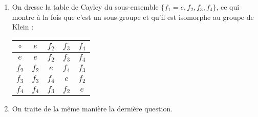 \begin{enumerate}
\item On dresse la table de Cayley du sous-ensemble $\{f_1=e, f_2,f_3, f_4\}$, ce qui montre à la fois que c'est un sous-groupe et qu'il est isomorphe au groupe de Klein :

\begin{center}
  \begin{tabular}{c|cccc}
    $\circ$    &      $e$ &      $f_2$  & $f_3$  &    $f_4$   \\
    \midrule
            $e$ &      $e$ &      $f_2$ & $f_3$ &    $f_4$  \\
            $f_2$ &   $f_2$ & $e$ &    $f_4$ &    $f_3$  \\
            $f_3$ & $f_3$ &      $f_4$ &      $e$ &    $f_2$  \\
            $f_4$ &    $f_4$ &    $f_3$ &    $f_2$ &      $e$  \\

  \end{tabular}
\end{center}

\item On traite de la même manière la dernière question.
\end{enumerate}

